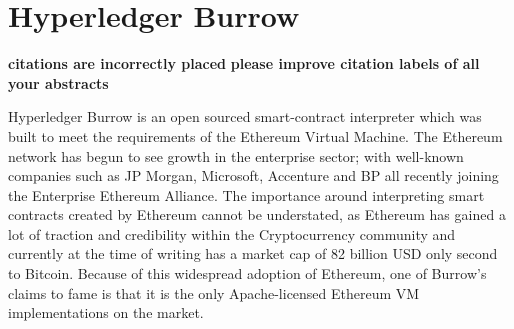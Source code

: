 \section{Hyperledger Burrow}

{\bf citations are incorrectly placed}
{\bf please improve citation labels of all your abstracts}

Hyperledger Burrow is an open sourced smart-contract interpreter which
was built to meet the requirements of the Ethereum Virtual
Machine. The Ethereum network has begun to see growth in the
enterprise sector; with well-known companies such as JP Morgan,
Microsoft, Accenture and BP all recently joining the Enterprise
Ethereum Alliance.\cite{Behlendorf} The importance around interpreting
smart contracts created by Ethereum cannot be understated, as Ethereum
has gained a lot of traction and credibility within the Cryptocurrency
community and currently at the time of writing has a market cap of 82
billion USD only second to Bitcoin. Because of this widespread
adoption of Ethereum, one of Burrow’s claims to fame is that it is the
only Apache-licensed Ethereum VM implementations on the
market.\cite{Hyperledger Burrow}

